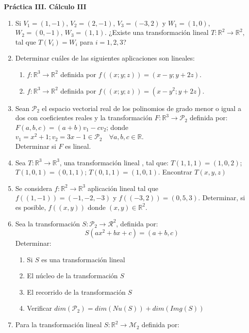 \documentclass[12pt,letterpaper]{article}
\begin{document}
\begin{center}
    {\Large \bf Práctica III. Cálculo III}
\end{center}

\begin{enumerate}
  \item Si $V_1 = (1,-1)$, $V_2 = (2,-1)$, $V_3=(-3,2)$ y $W_1=(1,0)$, $W_2=(0,-1)$, $W_3=(1,1)$. ¿Existe una transformación lineal $T: \mathbb{R}^2\to\mathbb{R}^2$, tal que $T(V_i) = W_i$ para $i=1,2,3$?
  \item Determinar cuáles de las siguientes aplicaciones son lineales:
  \begin{enumerate}
    \item $f : \mathbb{R}^3\to\mathbb{R}^2$ definida por $f((x; y; z)) = (x - y; y + 2z)$.
    \item $f : \mathbb{R}^3\to\mathbb{R}^2$ definida por $f((x; y; z)) = (x - y^2; y + 2z)$.
  \end{enumerate}
  \item Sean $\mathcal{P}_2$ el espacio vectorial real de los polinomios de grado menor o igual a dos con coeficientes reales y la transformación $F : \mathbb{R}^3\to\mathcal{P}_2$ definida por:\\
  $F(a,b,c) = (a + b)v_1 - cv_2$; donde $v_1 = x^2+1; v_2= 3x-1 \in \mathcal{P}_2 \quad\forall a,b,c \in \mathbb{R}$.\\
  Determinar si $F$ es lineal.
  \item Sea $T: \mathbb{R}^3\to\mathbb{R}^3$, una transformación lineal , tal que: $T (1,1,1) = (1,0,2)$; $T( 1,0,1) = (0,1,1)$; $T ( 0,1,1) = ( 1,0,1)$. Encontrar $T(x,y,z)$
  \item Se considera $f : \mathbb{R}^2\to\mathbb{R}^3$ aplicación lineal tal que $f((1,-1)) = (-1,-2,-3)$ y $f((-3, 2)) = (0, 5, 3)$. Determinar, si es posible, $f((x, y))$ donde $(x, y) \in \mathbb{R}^2$.
  \item Sea la transformación $S : \mathcal{P}_2\to\mathcal{R}^2$, definida por:
  $$
  S(ax^2 + bx + c) = (a + b,c)
  $$
  Determinar:
  \begin{enumerate}
    \item Si $S$ es una transformación lineal
    \item El núcleo de la transformación $S$
    \item El recorrido de la transformación $S$
    \item Verificar $dim(\mathcal{P}_2)= dim(Nu(S))+dim(Img(S))$
  \end{enumerate}
  \item Para la transformación lineal $S : \mathbb{R}^2\to\mathcal{M}_2$ definida por:

\end{enumerate}
\end{document}
